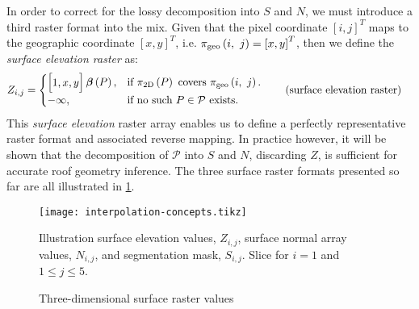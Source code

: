 In order to correct for the lossy decomposition into $S$ and $N$, we must introduce a third raster format into the mix.
Given that the pixel coordinate ${[i, j]}^T$ maps to the geographic coordinate $[x, y]^T$, i.e. $\pi_{\mathrm{geo}}\left(i,~j\right) = {[x, y]}^T$, then we define the \textit{surface elevation raster} as:
\begin{align*}
  Z_{i,j} &= \begin{cases}
    \begin{bmatrix}1, x, y\end{bmatrix} \planar{P}, &\text{if } \project{P} \text{ covers } \pixtogeo{i}{j}.\\
    -\infty, &\text{if no such } P \in \mathcal{P} \text{ exists}.
  \end{cases}
  \tag{surface elevation raster}%
  \label{eq:surface-elevation-raster}
\end{align*}
This \textit{surface elevation} raster array enables us to define a perfectly representative raster format and associated reverse mapping.
In practice however, it will be shown that the decomposition of $\mathcal{P}$ into $S$ and $N$, discarding $Z$, is sufficient for accurate roof geometry inference.
The three surface raster formats presented so far are all illustrated in \cref{fig:interpolation-concepts}.
\begin{figure}
  \centering
  \texttt{[image: interpolation-concepts.tikz]}
  \caption{Three-dimensional surface raster values}{%
    Illustration surface elevation values, $Z_{i,j}$, surface normal array values, $N_{i,j}$, and segmentation mask, $S_{i,j}$.
    Slice for $i = 1$ and $1 \leq j \leq 5$.
  }%
  \label{fig:interpolation-concepts}
\end{figure}

